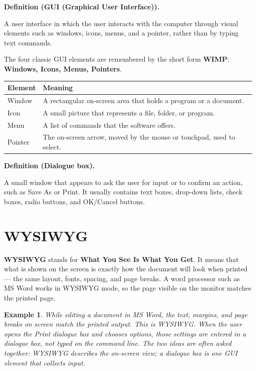 \documentclass[11pt]{article}
\newtheorem{example}{Example}[section]
\newenvironment{definitionbox}[1]{%
  \par\noindent\textbf{Definition (#1).}\ \itshape
}{\par\vspace{0.3em}}
\begin{document}
\begin{definitionbox}{GUI (Graphical User Interface)}
A user interface in which the user interacts with the computer through visual
elements such as windows, icons, menus, and a pointer, rather than by typing
text commands.
\end{definitionbox}

The four classic GUI elements are remembered by the short form \textbf{WIMP}:
\textbf{Windows, Icons, Menus, Pointers}.

\begin{center}
\begin{tabular}{p{}p{}}
\toprule
\textbf{Element} & \textbf{Meaning} \\
\midrule
Window & A rectangular on-screen area that holds a program or a document. \\
Icon & A small picture that represents a file, folder, or program. \\
Menu & A list of commands that the software offers. \\
Pointer & The on-screen arrow, moved by the mouse or touchpad, used to select. \\
\bottomrule
\end{tabular}
\end{center}

\begin{definitionbox}{Dialogue box}
A small window that appears to ask the user for input or to confirm an action,
such as Save As or Print. It usually contains text boxes, drop-down lists,
check boxes, radio buttons, and OK/Cancel buttons.
\end{definitionbox}

\section{WYSIWYG}
\textbf{WYSIWYG} stands for \textbf{What You See Is What You Get}. It means
that what is shown on the screen is exactly how the document will look when
printed --- the same layout, fonts, spacing, and page breaks. A word processor
such as MS Word works in WYSIWYG mode, so the page visible on the monitor
matches the printed page.

\begin{example}
While editing a document in MS Word, the text, margins, and page breaks on
screen match the printed output. This is WYSIWYG. When the user opens the
Print dialogue box and chooses options, those settings are entered in a
dialogue box, not typed on the command line. The two ideas are often asked
together: WYSIWYG describes the on-screen view; a dialogue box is one GUI
element that collects input.
\end{example}
\end{document}
